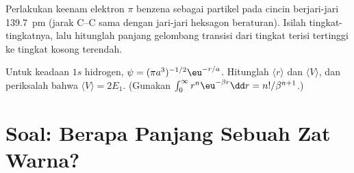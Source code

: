 \begin{exercise}[$\star\star\star$]\label{exo:b3:quantum-model-systems:11}
Perlakukan keenam elektron $\pi$ benzena sebagai partikel pada cincin
berjari-jari \qty{139.7}{pm} (jarak C--C sama dengan jari-jari heksagon
beraturan). Isilah tingkat-tingkatnya, lalu hitunglah panjang gelombang
transisi dari tingkat terisi tertinggi ke tingkat kosong terendah.
\end{exercise}

\begin{exercise}[$\star\star\star$]\label{exo:b3:quantum-model-systems:12}
Untuk keadaan $1s$ hidrogen, $\psi = (\pi a^3)^{-1/2}\eu^{-r/a}$. Hitunglah
 $\langle r\rangle$ dan $\langle V\rangle$, dan periksalah bahwa
$\langle V\rangle = 2E_1$. (Gunakan $\int_0^\infty r^n\eu^{-\beta r}\dd r =
n!/\beta^{n+1}$.)
\end{exercise}

\section{Soal: Berapa Panjang Sebuah Zat Warna?}

